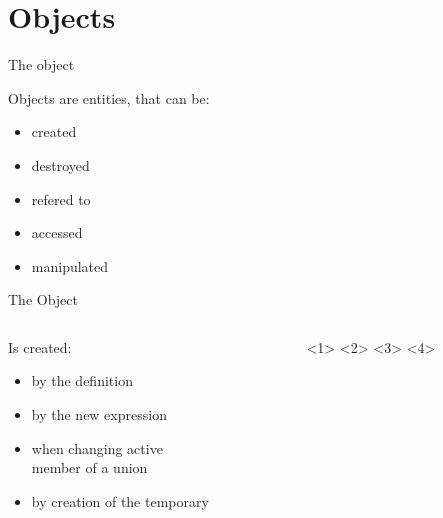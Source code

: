 \documentclass{panicsoftware-presentation}
\makeatletter
\newenvironment{itemizeSeq}{\begin{itemize}[<+-|alert@+>]}{\end{itemize}}
\makeatother
\begin{document}
\section*{Objects}

\begin{frame}{The object}

Objects are entities, that can be:
\begin{itemize}
	\item created
	\item destroyed
	\item refered to
	\item accessed
	\item manipulated
\end{itemize}

\end{frame}

\begin{frame}{The Object}

\begin{columns}
	\begin{column}{0.58\linewidth}
	
	Is created:
	\begin{itemizeSeq}
		\item by the definition
		\item by the new expression
		\item when changing active\\ member of a union
		\item by creation of the temporary
	\end{itemizeSeq}
	\end{column}

	\begin{column}{0.48\linewidth}
	
	\end{column}

\end{columns}

\end{frame}
\end{document}
